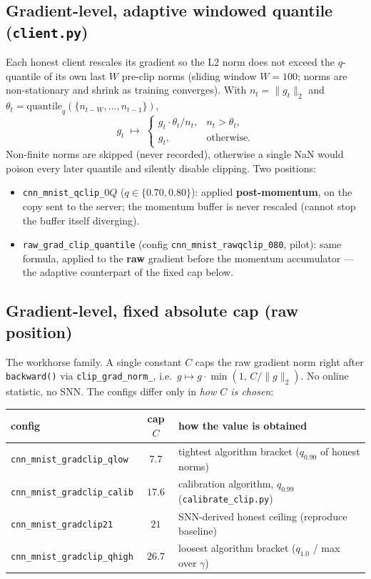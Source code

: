 \documentclass[11pt]{article}
\newcommand{\code}[1]{\texttt{#1}}
\begin{document}
\subsection{Gradient-level, adaptive windowed quantile (\code{client.py})}
Each honest client rescales its gradient so the L2 norm does not exceed the $q$-quantile of
its own last $W$ pre-clip norms (sliding window $W{=}100$; norms are non-stationary and shrink
as training converges). With $n_t=\lVert g_t\rVert_2$ and
$\theta_t=\mathrm{quantile}_q(\{n_{t-W},\dots,n_{t-1}\})$,
\[
  g_t \;\longmapsto\;
  \begin{cases}
    g_t\cdot \theta_t/n_t, & n_t>\theta_t,\\
    g_t, & \text{otherwise.}
  \end{cases}
\]
Non-finite norms are skipped (never recorded), otherwise a single NaN would poison every
later quantile and silently disable clipping. Two positions:
\begin{itemize}\itemsep1pt
  \item \code{cnn\_mnist\_qclip\_$0Q$} ($q\in\{0.70,0.80\}$): applied \textbf{post-momentum},
        on the copy sent to the server; the momentum buffer is never rescaled (cannot stop the
        buffer itself diverging).
  \item \code{raw\_grad\_clip\_quantile} (config \code{cnn\_mnist\_rawqclip\_080}, pilot):
        same formula, applied to the \textbf{raw} gradient before the momentum accumulator ---
        the adaptive counterpart of the fixed cap below.
\end{itemize}

\subsection{Gradient-level, fixed absolute cap (raw position)}
The workhorse family. A single constant $C$ caps the raw gradient norm right after
\code{backward()} via \code{clip\_grad\_norm\_}, i.e.\ $g\mapsto g\cdot\min(1,\,C/\lVert g\rVert_2)$.
No online statistic, no SNN. The configs differ only in \emph{how $C$ is chosen}:
\begin{center}
\begin{tabular}{@{}lcl@{}}
\toprule
config & cap $C$ & how the value is obtained \\
\midrule
\code{cnn\_mnist\_gradclip\_qlow}   & $7.7$  & tightest algorithm bracket ($q_{0.90}$ of honest norms) \\
\code{cnn\_mnist\_gradclip\_calib}  & $17.6$ & calibration algorithm, $q_{0.99}$ (\code{calibrate\_clip.py}) \\
\code{cnn\_mnist\_gradclip21}       & $21$   & SNN-derived honest ceiling (reproduce baseline) \\
\code{cnn\_mnist\_gradclip\_qhigh}  & $26.7$ & loosest algorithm bracket ($q_{1.0}$ / max over $\gamma$) \\
\bottomrule
\end{tabular}
\end{center}
\end{document}
